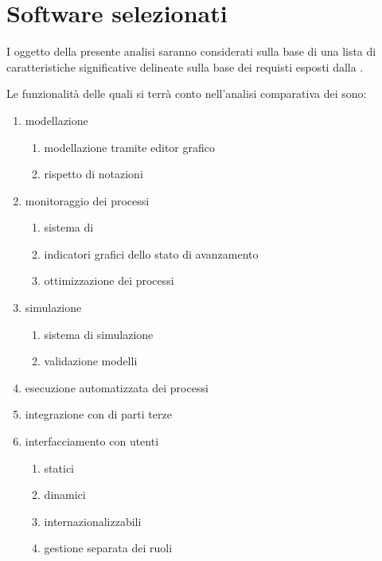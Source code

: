 \section{Software selezionati}
	I \sw oggetto della presente analisi saranno considerati sulla base di una lista di caratteristiche significative delineate sulla base dei requisti esposti dalla \customer.
	
	Le funzionalità delle quali si terrà conto nell'analisi comparativa dei \sw sono:
	
\begin{enumerate}
\renewcommand{\labelenumi}{\arabic{enumi}}		
\renewcommand{\labelenumii}{\arabic{enumi}.\arabic{enumii}}
  \item modellazione
 	\begin{enumerate}
	  \item modellazione tramite editor grafico
	  \item rispetto di notazioni 	
	\end{enumerate}
	\item monitoraggio dei processi
		\begin{enumerate}
		  \item sistema di 
		  \item indicatori grafici dello stato di avanzamento
		  \item ottimizzazione dei processi	
		\end{enumerate}		
	\item simulazione
		\begin{enumerate}
		  \item sistema di  simulazione
		  \item validazione modelli 	
		\end{enumerate}
	\item esecuzione automatizzata dei processi
	\item integrazione con \sw di parti terze
	\item interfacciamento con utenti
	\begin{enumerate}
	  \item {} statici
	  \item {} dinamici
	  \item {} internazionalizzabili
	  \item gestione separata dei ruoli 			
	\end{enumerate}
\end{enumerate}

